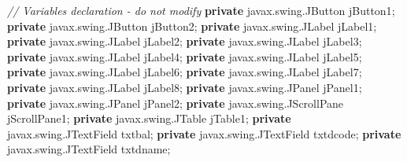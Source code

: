 \documentclass[
  10pt,
]{article}
\newenvironment{Shaded}{}{}
\newcommand{\CommentTok}[1]{\textcolor[rgb]{0.38,0.63,0.69}{\textit{#1}}}
\newcommand{\FunctionTok}[1]{\textcolor[rgb]{0.02,0.16,0.49}{#1}}
\newcommand{\KeywordTok}[1]{\textcolor[rgb]{0.00,0.44,0.13}{\textbf{#1}}}
\newcommand{\NormalTok}[1]{#1}
\newcommand{\OperatorTok}[1]{\textcolor[rgb]{0.40,0.40,0.40}{#1}}
\begin{document}
\begin{Shaded}
\begin{Highlighting}[numbers=left,,]
    \CommentTok{// Variables declaration {-} do not modify                     }
    \KeywordTok{private}\NormalTok{ javax}\OperatorTok{.}\FunctionTok{swing}\OperatorTok{.}\FunctionTok{JButton}\NormalTok{ jButton1}\OperatorTok{;}
    \KeywordTok{private}\NormalTok{ javax}\OperatorTok{.}\FunctionTok{swing}\OperatorTok{.}\FunctionTok{JButton}\NormalTok{ jButton2}\OperatorTok{;}
    \KeywordTok{private}\NormalTok{ javax}\OperatorTok{.}\FunctionTok{swing}\OperatorTok{.}\FunctionTok{JLabel}\NormalTok{ jLabel1}\OperatorTok{;}
    \KeywordTok{private}\NormalTok{ javax}\OperatorTok{.}\FunctionTok{swing}\OperatorTok{.}\FunctionTok{JLabel}\NormalTok{ jLabel2}\OperatorTok{;}
    \KeywordTok{private}\NormalTok{ javax}\OperatorTok{.}\FunctionTok{swing}\OperatorTok{.}\FunctionTok{JLabel}\NormalTok{ jLabel3}\OperatorTok{;}
    \KeywordTok{private}\NormalTok{ javax}\OperatorTok{.}\FunctionTok{swing}\OperatorTok{.}\FunctionTok{JLabel}\NormalTok{ jLabel4}\OperatorTok{;}
    \KeywordTok{private}\NormalTok{ javax}\OperatorTok{.}\FunctionTok{swing}\OperatorTok{.}\FunctionTok{JLabel}\NormalTok{ jLabel5}\OperatorTok{;}
    \KeywordTok{private}\NormalTok{ javax}\OperatorTok{.}\FunctionTok{swing}\OperatorTok{.}\FunctionTok{JLabel}\NormalTok{ jLabel6}\OperatorTok{;}
    \KeywordTok{private}\NormalTok{ javax}\OperatorTok{.}\FunctionTok{swing}\OperatorTok{.}\FunctionTok{JLabel}\NormalTok{ jLabel7}\OperatorTok{;}
    \KeywordTok{private}\NormalTok{ javax}\OperatorTok{.}\FunctionTok{swing}\OperatorTok{.}\FunctionTok{JLabel}\NormalTok{ jLabel8}\OperatorTok{;}
    \KeywordTok{private}\NormalTok{ javax}\OperatorTok{.}\FunctionTok{swing}\OperatorTok{.}\FunctionTok{JPanel}\NormalTok{ jPanel1}\OperatorTok{;}
    \KeywordTok{private}\NormalTok{ javax}\OperatorTok{.}\FunctionTok{swing}\OperatorTok{.}\FunctionTok{JPanel}\NormalTok{ jPanel2}\OperatorTok{;}
    \KeywordTok{private}\NormalTok{ javax}\OperatorTok{.}\FunctionTok{swing}\OperatorTok{.}\FunctionTok{JScrollPane}\NormalTok{ jScrollPane1}\OperatorTok{;}
    \KeywordTok{private}\NormalTok{ javax}\OperatorTok{.}\FunctionTok{swing}\OperatorTok{.}\FunctionTok{JTable}\NormalTok{ jTable1}\OperatorTok{;}
    \KeywordTok{private}\NormalTok{ javax}\OperatorTok{.}\FunctionTok{swing}\OperatorTok{.}\FunctionTok{JTextField}\NormalTok{ txtbal}\OperatorTok{;}
    \KeywordTok{private}\NormalTok{ javax}\OperatorTok{.}\FunctionTok{swing}\OperatorTok{.}\FunctionTok{JTextField}\NormalTok{ txtdcode}\OperatorTok{;}
    \KeywordTok{private}\NormalTok{ javax}\OperatorTok{.}\FunctionTok{swing}\OperatorTok{.}\FunctionTok{JTextField}\NormalTok{ txtdname}\OperatorTok{;}

\end{Highlighting}
\end{Shaded}
\end{document}
